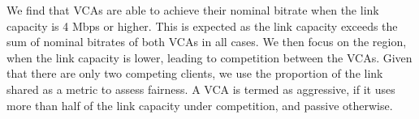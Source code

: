 We find that VCAs are able to achieve their nominal bitrate when the link capacity is 4 Mbps or higher. This is expected as the link capacity exceeds the sum of nominal bitrates of both VCAs in all cases. We then focus on the region, when the link capacity is lower, leading to competition between the VCAs. Given that there are only two competing clients, we use the proportion of the link shared as a metric to assess fairness. A VCA is termed as aggressive, if it uses more than half of the link capacity under competition, and passive otherwise.

